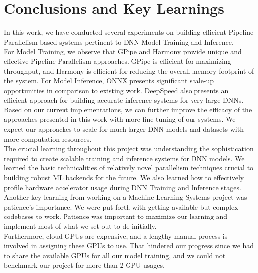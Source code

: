 \documentclass[conference]{IEEEtran}
\begin{document}
\section{Conclusions and Key Learnings}
In this work, we have conducted several experiments on building efficient Pipeline Parallelism-based systems pertinent to DNN Model Training and Inference. \\
For Model Training, we observe that GPipe and Harmony provide unique and effective Pipeline Parallelism approaches. GPipe is efficient for maximizing throughput, and Harmony is efficient for reducing the overall memory footprint of the system. For Model Inference, ONNX presents significant scale-up opportunities in comparison to existing work. DeepSpeed also presents an efficient approach for building accurate inference systems for very large DNNs. \\
Based on our current implementations, we can further improve the efficacy of the approaches presented in this work with more fine-tuning of our systems. We expect our approaches to scale for much larger DNN models and datasets with more computation resources. \\

The crucial learning throughout this project was understanding the sophistication required to create scalable training and inference systems for DNN models. We learned the basic technicalities of relatively novel parallelism techniques crucial to building robust ML backends for the future. We also learned how to effectively profile hardware accelerator usage during DNN Training and Inference stages. Another key learning from working on a Machine Learning Systems project was patience's importance. We were put forth with getting available but complex codebases to work. Patience was important to maximize our learning and implement most of what we set out to do initially. \\
Furthermore, cloud GPUs are expensive, and a lengthy manual process is involved in assigning these GPUs to use. That hindered our progress since we had to share the available GPUs for all our model training, and we could not benchmark our project for more than 2 GPU usages.
\end{document}
